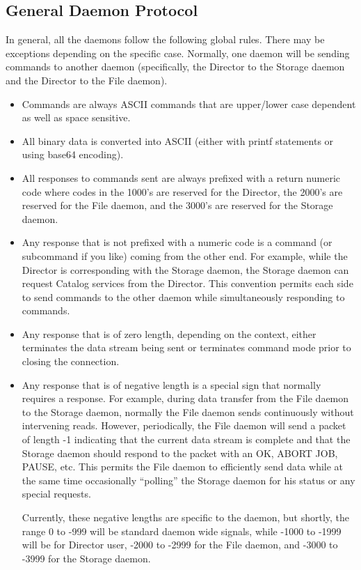 \subsection*{General Daemon Protocol}

In general, all the daemons follow the following global rules. There may be
exceptions depending on the specific case. Normally, one daemon will be
sending commands to another daemon (specifically, the Director to the Storage
daemon and the Director to the File daemon). 

\begin{itemize}
\item Commands are always ASCII commands that are  upper/lower case dependent
   as well as space sensitive.  
\item All binary data is converted into ASCII (either with printf statements
   or  using base64 encoding).  
\item All responses to commands sent are always  prefixed with a return
   numeric code where codes in the 1000's are  reserved for the Director, the
   2000's are reserved for the  File daemon, and the 3000's are reserved for the
Storage daemon.  
\item Any response that is not prefixed with a numeric  code is a command (or
   subcommand if you like) coming  from the other end. For example, while the
   Director is  corresponding with the Storage daemon, the Storage daemon  can
request Catalog services from the Director. This  convention permits each side
to send commands to the  other daemon while simultaneously responding to
commands.  
\item Any response that is of zero length, depending on the context,  either
   terminates the data stream being sent or terminates command mode  prior to
   closing the connection. 
\item Any response that is of negative length is a special sign that  normally
   requires a response. For example, during data transfer from the  File daemon
   to the Storage daemon, normally the File daemon  sends continuously without
intervening reads. However, periodically,  the File daemon will send a packet
of length -1 indicating that  the current data stream is complete and that the
Storage  daemon should respond to the packet with an OK, ABORT JOB,  PAUSE,
etc. This permits the File daemon to efficiently send  data while at the same
time occasionally ``polling''  the Storage daemon for his status or any
special requests.  

Currently, these negative lengths are specific to the daemon, but  shortly,
the range 0 to -999 will be standard daemon wide signals,  while -1000 to
-1999 will be for Director user, -2000 to -2999  for the File daemon, and
-3000 to -3999 for the Storage  daemon. 
\end{itemize}

